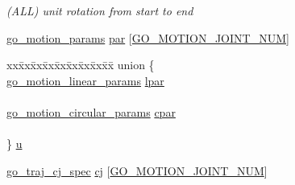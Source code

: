 \begin{DoxyCompactItemize}
\begin{DoxyCompactList}\small\item\em (A\-L\-L) unit rotation from start to end \end{DoxyCompactList}\item 
\hyperlink{structgomotion_1_1go__motion__params}{go\-\_\-motion\-\_\-params} \hyperlink{structgomotion_1_1go__motion__spec_a71e60787cb50243693e8588918b8fe29}{par} \mbox{[}\hyperlink{gomotion_8h_ac7b4e696e30d95d9a3d178233eabed55}{G\-O\-\_\-\-M\-O\-T\-I\-O\-N\-\_\-\-J\-O\-I\-N\-T\-\_\-\-N\-U\-M}\mbox{]}
\item 
\begin{tabbing}
xx\=xx\=xx\=xx\=xx\=xx\=xx\=xx\=xx\=\kill
union \{\\
\>\hyperlink{structgomotion_1_1go__motion__linear__params}{go\_motion\_linear\_params} \hyperlink{structgomotion_1_1go__motion__spec_a25d35e4638e0dd5721409d02e2f48445}{lpar}\\
\>\\
\>\hyperlink{structgomotion_1_1go__motion__circular__params}{go\_motion\_circular\_params} \hyperlink{structgomotion_1_1go__motion__spec_a4f8c8e620396ab92594d65f1d98bbdcc}{cpar}\\
\>\\
\} \hyperlink{structgomotion_1_1go__motion__spec_a68cb712eaf58a3aeb5f99d11cdbef5eb}{u}\\

\end{tabbing}\item 
\hyperlink{structgomotion_1_1go__traj__cj__spec}{go\-\_\-traj\-\_\-cj\-\_\-spec} \hyperlink{structgomotion_1_1go__motion__spec_ac585087da484a433071bfa02e712a979}{cj} \mbox{[}\hyperlink{gomotion_8h_ac7b4e696e30d95d9a3d178233eabed55}{G\-O\-\_\-\-M\-O\-T\-I\-O\-N\-\_\-\-J\-O\-I\-N\-T\-\_\-\-N\-U\-M}\mbox{]}
\end{DoxyCompactItemize}


